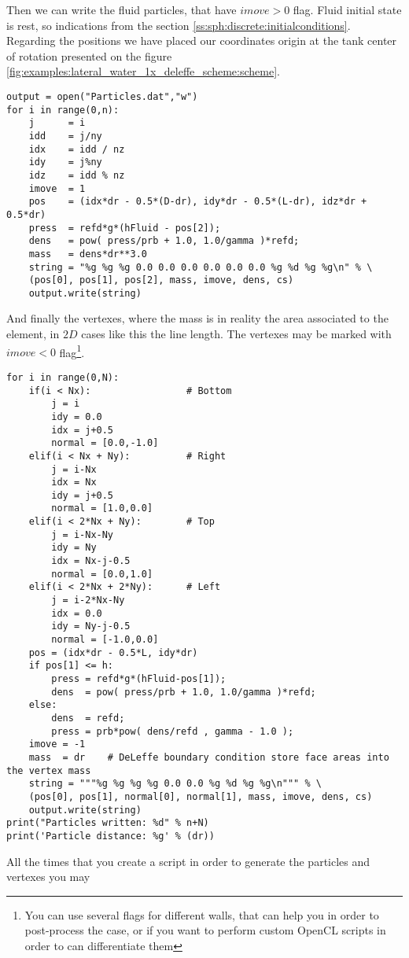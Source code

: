 %
Then we can write the fluid particles, that have $imove > 0$ flag. Fluid initial state is rest, so
indications from the section \ref{ss:sph:discrete:initialconditions}. Regarding the positions we
have placed our coordinates origin at the tank center of rotation presented on the figure
\ref{fig:examples:lateral_water_1x_deleffe_scheme:scheme}.
%
\begin{verbatim}
output = open("Particles.dat","w")
for i in range(0,n):
    j      = i
    idd    = j/ny
    idx    = idd / nz
    idy    = j%ny
    idz    = idd % nz
    imove  = 1
    pos    = (idx*dr - 0.5*(D-dr), idy*dr - 0.5*(L-dr), idz*dr + 0.5*dr)
    press  = refd*g*(hFluid - pos[2]);
    dens   = pow( press/prb + 1.0, 1.0/gamma )*refd;
    mass   = dens*dr**3.0
    string = "%g %g %g 0.0 0.0 0.0 0.0 0.0 0.0 %g %d %g %g\n" % \
    (pos[0], pos[1], pos[2], mass, imove, dens, cs)
    output.write(string)
\end{verbatim}
%
And finally the vertexes, where the mass is in reality the area associated to the element, in $2D$
cases like this the line length. The vertexes may be marked with $imove < 0$ flag\footnote{You can
use several flags for different walls, that can help you in order to post-process the case, or
if you want to perform custom OpenCL scripts in order to can differentiate them}.
%
\begin{verbatim}
for i in range(0,N):
    if(i < Nx):                 # Bottom
        j = i
        idy = 0.0
        idx = j+0.5
        normal = [0.0,-1.0]
    elif(i < Nx + Ny):          # Right
        j = i-Nx
        idx = Nx
        idy = j+0.5
        normal = [1.0,0.0]
    elif(i < 2*Nx + Ny):        # Top
        j = i-Nx-Ny
        idy = Ny
        idx = Nx-j-0.5
        normal = [0.0,1.0]
    elif(i < 2*Nx + 2*Ny):      # Left
        j = i-2*Nx-Ny
        idx = 0.0
        idy = Ny-j-0.5
        normal = [-1.0,0.0]
    pos = (idx*dr - 0.5*L, idy*dr)
    if pos[1] <= h:
        press = refd*g*(hFluid-pos[1]);
        dens  = pow( press/prb + 1.0, 1.0/gamma )*refd;
    else:
        dens  = refd;
        press = prb*pow( dens/refd , gamma - 1.0 );
    imove = -1
    mass  = dr    # DeLeffe boundary condition store face areas into the vertex mass
    string = """%g %g %g %g 0.0 0.0 %g %d %g %g\n""" % \
    (pos[0], pos[1], normal[0], normal[1], mass, imove, dens, cs)
    output.write(string)
print("Particles written: %d" % n+N)
print('Particle distance: %g' % (dr))
\end{verbatim}
%
All the times that you create a script in order to generate the particles and vertexes you may
